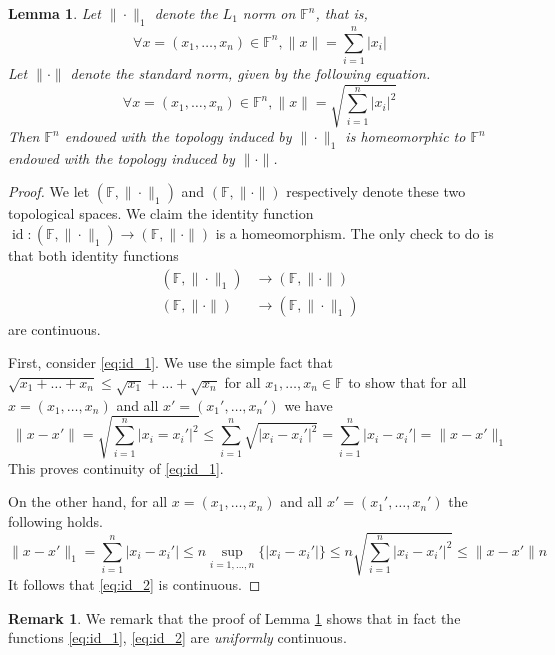\documentclass[12pt]{article}
\theoremstyle{plain}
\newtheorem{lemma}[thm]{Lemma}
\theoremstyle{definition}
\newtheorem{remark}[thm]{Remark}
\newcommand{\bb}[1]{\mathbb{#1}}
\newcommand{\lto}{\longrightarrow}
\begin{document}
	\begin{lemma}\label{lem:homeomorphic_F}
		Let $\| \cdot \|_1$ denote the $L_1$ norm on $\bb{F}^n$, that is,
		\begin{equation}
			\forall x = (x_1,\ldots, x_n) \in \bb{F}^n, \| x \| = \sum_{i = 1}^n | x_i |
			\end{equation}
		Let $\| \cdot \|$ denote the standard norm, given by the following equation.
		\begin{equation}
			\forall x = (x_1, \ldots, x_n) \in \bb{F}^n, \| x \| = \sqrt{\sum_{i = 1}^n |x_i|^2}
			\end{equation}
		Then $\bb{F}^n$ endowed with the topology induced by $\| \cdot \|_1$ is homeomorphic to $\bb{F}^n$ endowed with the topology induced by $\| \cdot \|$.
		\end{lemma}
	\begin{proof}
		We let $(\bb{F}, \| \cdot \|_1)$ and $(\bb{F}, \| \cdot \|)$ respectively denote these two topological spaces. We claim the identity function $\operatorname{id}: (\bb{F}, \| \cdot \|_1) \lto (\bb{F}, \| \cdot \|)$ is a homeomorphism. The only check to do is that both identity functions 
		\begin{align}
			\label{eq:id_1}(\bb{F}, \| \cdot \|_1) &\lto (\bb{F}, \| \cdot \|)\\
			\label{eq:id_2}(\bb{F}, \| \cdot \|) &\lto (\bb{F}, \| \cdot \|_1)
			\end{align}
		are continuous.
		
		First, consider \eqref{eq:id_1}. We use the simple fact that $\sqrt{x_1 + \ldots + x_n} \leq \sqrt{x_1} + \ldots + \sqrt{x_n}$ for all $x_1,\ldots, x_n \in \bb{F}$ to show that for all $x = (x_1,\ldots, x_n)$ and all $x' = (x_1',\ldots, x_n')$ we have
		\begin{equation}
			\| x - x' \| = \sqrt{\sum_{i=1}^n |x_i = x_i'|^2} \leq \sum_{i = 1}^n \sqrt{|x_i - x_i'|^2} = \sum_{i = 1}^n |x_i - x_i'| = \| x - x' \|_1
			\end{equation}
		This proves continuity of \eqref{eq:id_1}.
		
		On the other hand, for all $x = (x_1,\ldots, x_n)$ and all $x' = (x_1',\ldots, x_n')$ the following holds.
		\begin{equation}
			\| x - x' \|_1 = \sum_{i = 1}^n | x_i - x_i' | \leq n \operatorname{sup}_{i = 1,..., n}\{ |x_i - x_i'| \} \leq n \sqrt{\sum_{i = 1}^n | x_i - x_i' |^2} \leq \| x - x' \| n
			\end{equation}
		It follows that \eqref{eq:id_2} is continuous.
		\end{proof}
	\begin{remark}
		We remark that the proof of Lemma \ref{lem:homeomorphic_F} shows that in fact the functions \eqref{eq:id_1}, \eqref{eq:id_2} are \emph{uniformly} continuous.
		\end{remark}
	
\end{document}
